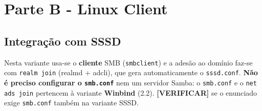 
\chapter[Parte B - Linux Client]{Parte B - Linux Client}

\section[Integração com SSSD]{Integração com SSSD}

\begin{notabox}[title={Nota}]
Nesta variante usa-se o \textbf{cliente} SMB (\texttt{smbclient}) e a adesão ao domínio faz-se com \texttt{realm join} (realmd + adcli), que gera automaticamente o \texttt{sssd.conf}. \textbf{Não é preciso configurar o \texttt{smb.conf}} nem um servidor Samba: o \texttt{smb.conf} e o \texttt{net ads join} pertencem à variante \textbf{Winbind} (2.2). \textbf{[VERIFICAR]} se o enunciado exige \texttt{smb.conf} também na variante SSSD.
\end{notabox}
